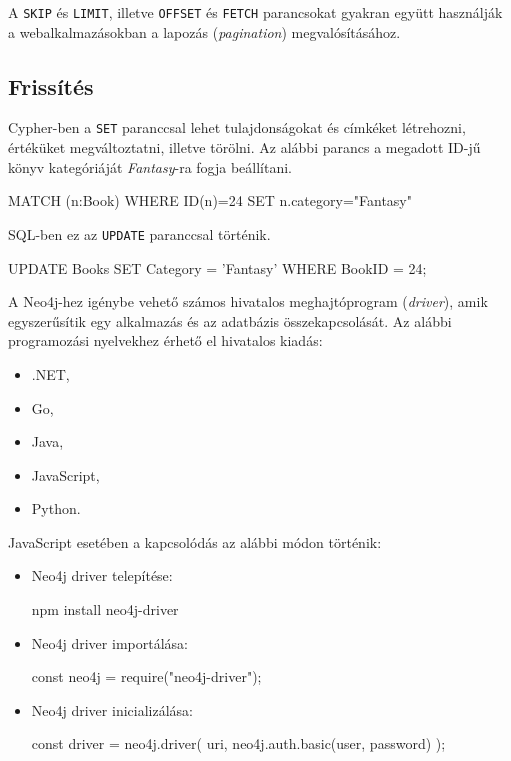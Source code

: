 A \texttt{SKIP} és \texttt{LIMIT}, illetve \texttt{OFFSET} és \texttt{FETCH} parancsokat gyakran együtt használják a webalkalmazásokban a lapozás (\textit{pagination}) megvalósításához.

\subsection{Frissítés}
Cypher-ben a \texttt{SET} paranccsal lehet tulajdonságokat és címkéket létrehozni, értéküket megváltoztatni, illetve törölni. Az alábbi parancs a megadott ID-jű könyv kategóriáját \textit{Fantasy}-ra fogja beállítani.
\begin{java}[columns=fullflexible]
MATCH (n:Book) 
WHERE ID(n)=24
SET n.category="Fantasy"
\end{java}
SQL-ben ez az \texttt{UPDATE} paranccsal történik.
\begin{java}[columns=fullflexible]
UPDATE Books
SET Category = 'Fantasy'
WHERE BookID = 24;
\end{java}


A Neo4j-hez igénybe vehető számos hivatalos meghajtóprogram (\textit{driver}), amik egyszerűsítik egy alkalmazás és az adatbázis összekapcsolását. Az alábbi programozási nyelvekhez érhető el hivatalos kiadás:
\begin{itemize}
    \item .NET,
    \item Go,
    \item Java,
    \item JavaScript,
    \item Python.
\end{itemize}
JavaScript esetében a kapcsolódás az alábbi módon történik:
\begin{itemize}
\item Neo4j driver telepítése:
\begin{java}
npm install neo4j-driver
\end{java}
\item Neo4j driver importálása: 
\begin{java}
const neo4j = require("neo4j-driver");
\end{java}
\item Neo4j driver inicializálása:
\begin{java}
const driver = neo4j.driver(
  uri,
  neo4j.auth.basic(user, password)
);
\end{java}
\end{itemize}

